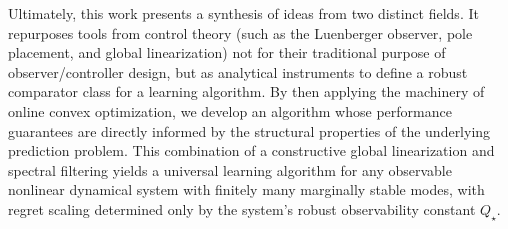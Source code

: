 \documentclass[11pt]{article}
\numberwithin{equation}{section}
\begin{document}
Ultimately, this work presents a synthesis of ideas from two distinct fields. It repurposes tools from control theory (such as the Luenberger observer, pole placement, and global linearization) not for their traditional purpose of observer/controller design, but as analytical instruments to define a robust comparator class for a learning algorithm.  By then applying the machinery of online convex optimization, we develop an algorithm whose performance guarantees are directly informed by the structural properties of the underlying prediction problem.  This combination of a constructive global linearization and  spectral filtering yields a universal learning algorithm for any observable nonlinear dynamical system with finitely many marginally stable modes, with regret scaling determined only by the system’s robust observability constant $Q_\star$.
\end{document}
